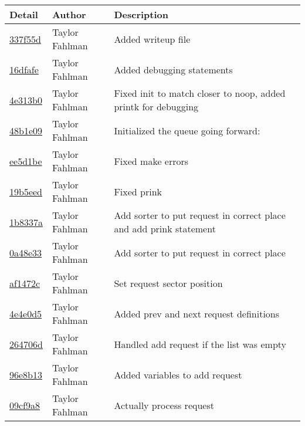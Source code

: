 \begin{tabular}{l l l}\textbf{Detail} & \textbf{Author} & \textbf{Description}\\\hline
\href{git@github.com:fahlmant/cs444/commit/337f55d1a7a77b5840ab7cd55d3b98e6f8a4ea61}{337f55d} & Taylor Fahlman & Added writeup file\\\hline
\href{git@github.com:fahlmant/cs444/commit/16dfafe2b2ddaa55c00dc6f13d1624f5f348abdc}{16dfafe} & Taylor Fahlman & Added debugging statements\\\hline
\href{git@github.com:fahlmant/cs444/commit/4e313b07a7ce52c2eeb15e77780b0344fd58e776}{4e313b0} & Taylor Fahlman & Fixed init to match closer to noop, added printk for debugging\\\hline
\href{git@github.com:fahlmant/cs444/commit/48b1e091f6f8445fc355268ded9d2ab085f38217}{48b1e09} & Taylor Fahlman & Initialized the queue going forward:\\\hline
\href{git@github.com:fahlmant/cs444/commit/ee5d1be765a4359e795c1cfab79f45e7157dc427}{ee5d1be} & Taylor Fahlman & Fixed make errors\\\hline
\href{git@github.com:fahlmant/cs444/commit/19b5eed5fce8f0988d6de8e32433e71ec722f401}{19b5eed} & Taylor Fahlman & Fixed prink\\\hline
\href{git@github.com:fahlmant/cs444/commit/1b8337adbfd556c19331c13e47fdf30f6be4aa2c}{1b8337a} & Taylor Fahlman & Add sorter to put request in correct place and add prink statement\\\hline
\href{git@github.com:fahlmant/cs444/commit/0a48e33e7e336bcfa08225cb01f3df0fcaaed1f8}{0a48e33} & Taylor Fahlman & Add sorter to put request in correct place\\\hline
\href{git@github.com:fahlmant/cs444/commit/af1472c36acd59ba67588633806bf0893cfe8b8b}{af1472c} & Taylor Fahlman & Set request sector position\\\hline
\href{git@github.com:fahlmant/cs444/commit/4e4e0d50bb79cb0287dd9e15bf858950aca4e52c}{4e4e0d5} & Taylor Fahlman & Added prev and next request definitions\\\hline
\href{git@github.com:fahlmant/cs444/commit/264706d970dd72869b019450b1f75bc089303f51}{264706d} & Taylor Fahlman & Handled add request if the list was empty\\\hline
\href{git@github.com:fahlmant/cs444/commit/96e8b1364367fb70321afbf63863220dec0966bb}{96e8b13} & Taylor Fahlman & Added variables to add request\\\hline
\href{git@github.com:fahlmant/cs444/commit/09cf9a81142f457cc824439568eb4f7d0202b485}{09cf9a8} & Taylor Fahlman & Actually process request\\\hline

\end{tabular}
